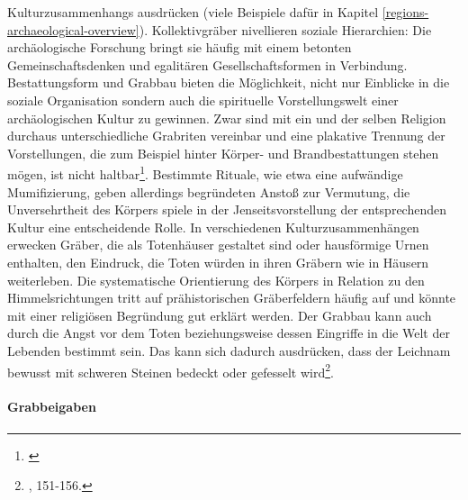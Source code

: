 \documentclass[openany,twoside,twocolumn]{book}
\let\rmarkdownfootnote\footnote%
\def\footnote{\protect\rmarkdownfootnote}
\begin{document}
Kulturzusammenhangs ausdrücken (viele Beispiele dafür in Kapitel
\ref{regions-archaeological-overview}). Kollektivgräber nivellieren
soziale Hierarchien: Die archäologische Forschung bringt sie häufig mit
einem betonten Gemeinschaftsdenken und egalitären Gesellschaftsformen in
Verbindung. Bestattungsform und Grabbau bieten die Möglichkeit, nicht
nur Einblicke in die soziale Organisation sondern auch die spirituelle
Vorstellungswelt einer archäologischen Kultur zu gewinnen. Zwar sind mit
ein und der selben Religion durchaus unterschiedliche Grabriten
vereinbar und eine plakative Trennung der Vorstellungen, die zum
Beispiel hinter Körper- und Brandbestattungen stehen mögen, ist nicht
haltbar\footnote{\textcite{portmann_sterben_1993}}. Bestimmte Rituale,
wie etwa eine aufwändige Mumifizierung, geben allerdings begründeten
Anstoß zur Vermutung, die Unversehrtheit des Körpers spiele in der
Jenseitsvorstellung der entsprechenden Kultur eine entscheidende Rolle.
In verschiedenen Kulturzusammenhängen erwecken Gräber, die als
Totenhäuser gestaltet sind oder hausförmige Urnen enthalten, den
Eindruck, die Toten würden in ihren Gräbern wie in Häusern weiterleben.
Die systematische Orientierung des Körpers in Relation zu den
Himmelsrichtungen tritt auf prähistorischen Gräberfeldern häufig auf und
könnte mit einer religiösen Begründung gut erklärt werden. Der Grabbau
kann auch durch die Angst vor dem Toten beziehungsweise dessen Eingriffe
in die Welt der Lebenden bestimmt sein. Das kann sich dadurch
ausdrücken, dass der Leichnam bewusst mit schweren Steinen bedeckt oder
gefesselt wird\footnote{\textcite{hofmann_rituelle_2008}, 151-156.}.

\hypertarget{grabbeigaben}{%
\paragraph{Grabbeigaben}\label{grabbeigaben}}
\end{document}
